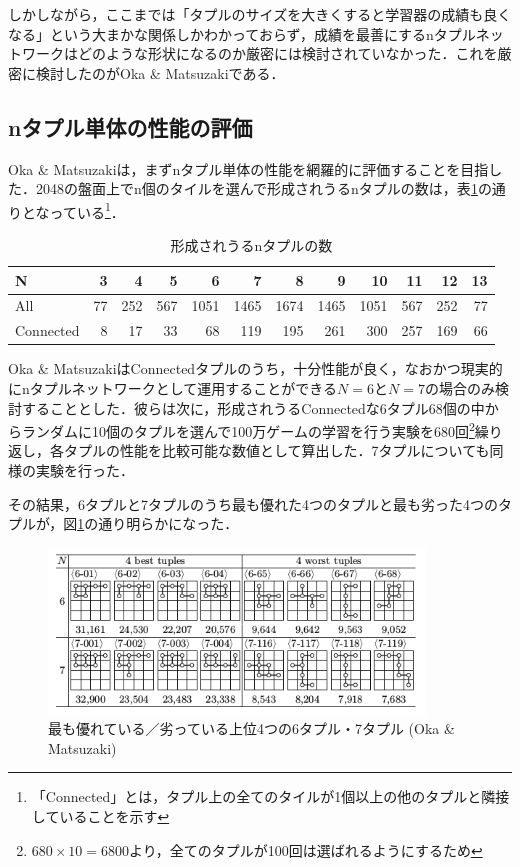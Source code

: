 \documentclass{suribt}
\begin{document}
しかしながら，ここまでは「タプルのサイズを大きくすると学習器の成績も良くなる」という大まかな関係しかわかっておらず，成績を最善にするnタプルネットワークはどのような形状になるのか厳密には検討されていなかった．これを厳密に検討したのがOka \& Matsuzakiである．

\subsection{nタプル単体の性能の評価}
Oka \& Matsuzakiは，まずnタプル単体の性能を網羅的に評価することを目指した．2048の盤面上でn個のタイルを選んで形成されうるnタプルの数は，表\ref{tab:ntuplesNumber}の通りとなっている\footnote{「Connected」とは，タプル上の全てのタイルが1個以上の他のタプルと隣接していることを示す}．

\begin{table}[t]
	\begin{center}
		\caption{形成されうるnタプルの数}
		\begin{tabular}{l|r|r|r|r|r|r|r|r|r|r|r} \hline
		N & 3 & 4 & 5 & 6 & 7 & 8 & 9 & 10 & 11 & 12 & 13 \\ \hline \hline
		All & 77 & 252 & 567 & 1051 & 1465 & 1674 & 1465 & 1051 & 567 & 252 & 77 \\ \hline
		Connected & 8 & 17 & 33 & 68 & 119 & 195 & 261 & 300 & 257 & 169 & 66 \\ \hline
		\end{tabular}
		\label{tab:ntuplesNumber}
	\end{center}
\end{table}

Oka \& MatsuzakiはConnectedタプルのうち，十分性能が良く，なおかつ現実的にnタプルネットワークとして運用することができる$N=6$と$N=7$の場合のみ検討することとした．彼らは次に，形成されうるConnectedな6タプル68個の中からランダムに10個のタプルを選んで100万ゲームの学習を行う実験を680回\footnote{$680 \times 10 = 6800$より，全てのタプルが100回は選ばれるようにするため}繰り返し，各タプルの性能を比較可能な数値として算出した．7タプルについても同様の実験を行った．

その結果，6タプルと7タプルのうち最も優れた4つのタプルと最も劣った4つのタプルが，図\ref{figure_004}の通り明らかになった．

\begin{figure}[t]
	\begin{center}
	\includegraphics[width=10cm]{figure_004.png}
	\caption{最も優れている／劣っている上位4つの6タプル・7タプル (Oka \& Matsuzaki)}
	\label{figure_004}
	\end{center}
\end{figure}
\end{document}
